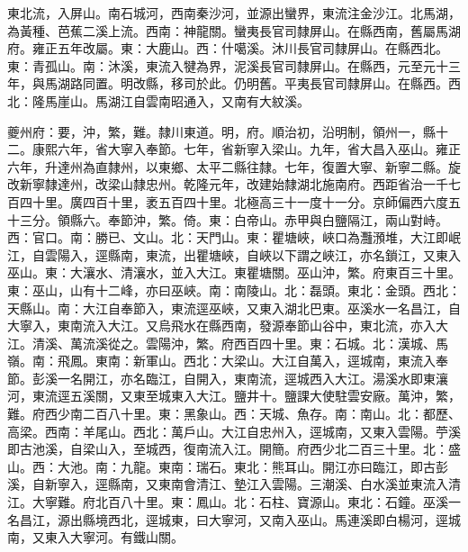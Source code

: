 \begin{pinyinscope}
東北流，入屏山。南石城河，西南秦沙河，並源出蠻界，東流注金沙江。北馬湖，為黃種、芭蕉二溪上流。西南：神龍關。蠻夷長官司隸屏山。在縣西南，舊屬馬湖府。雍正五年改屬。東：大鹿山。西：什噶溪。沐川長官司隸屏山。在縣西北。東：青孤山。南：沐溪，東流入犍為界，泥溪長官司隸屏山。在縣西，元至元十三年，與馬湖路同置。明改縣，移司於此。仍明舊。平夷長官司隸屏山。在縣西。西北：隆馬崖山。馬湖江自雲南昭通入，又南有大紋溪。

夔州府：要，沖，繁，難。隸川東道。明，府。順治初，沿明制，領州一，縣十二。康熙六年，省大寧入奉節。七年，省新寧入梁山。九年，省大昌入巫山。雍正六年，升達州為直隸州，以東鄉、太平二縣往隸。七年，復置大寧、新寧二縣。旋改新寧隸達州，改梁山隸忠州。乾隆元年，改建始隸湖北施南府。西距省治一千七百四十里。廣四百十里，袤五百四十里。北極高三十一度十一分。京師偏西六度五十三分。領縣六。奉節沖，繁。倚。東：白帝山。赤甲與白鹽隔江，兩山對峙。西：官口。南：勝已、文山。北：天門山。東：瞿塘峽，峽口為灩澦堆，大江即岷江，自雲陽入，逕縣南，東流，出瞿塘峽，自峽以下謂之峽江，亦名鎖江，又東入巫山。東：大瀼水、清瀼水，並入大江。東瞿塘關。巫山沖，繁。府東百三十里。東：巫山，山有十二峰，亦曰巫峽。南：南陵山。北：磊頭。東北：金頭。西北：天縣山。南：大江自奉節入，東流逕巫峽，又東入湖北巴東。巫溪水一名昌江，自大寧入，東南流入大江。又烏飛水在縣西南，發源奉節山谷中，東北流，亦入大江。清溪、萬流溪從之。雲陽沖，繁。府西百四十里。東：石城。北：漢城、馬嶺。南：飛鳳。東南：新軍山。西北：大梁山。大江自萬入，逕城南，東流入奉節。彭溪一名開江，亦名臨江，自開入，東南流，逕城西入大江。湯溪水即東瀼河，東流逕五溪關，又東至城東入大江。鹽井十。鹽課大使駐雲安廠。萬沖，繁，難。府西少南二百八十里。東：黑象山。西：天城、魚存。南：南山。北：都歷、高梁。西南：羊尾山。西北：萬戶山。大江自忠州入，逕城南，又東入雲陽。苧溪即古池溪，自梁山入，至城西，復南流入江。開簡。府西少北二百三十里。北：盛山。西：大池。南：九龍。東南：瑞石。東北：熊耳山。開江亦曰臨江，即古彭溪，自新寧入，逕縣南，又東南會清江、墊江入雲陽。三潮溪、白水溪並東流入清江。大寧難。府北百八十里。東：鳳山。北：石柱、寶源山。東北：石鐘。巫溪一名昌江，源出縣境西北，逕城東，曰大寧河，又南入巫山。馬連溪即白楊河，逕城南，又東入大寧河。有鐵山關。


\end{pinyinscope}
